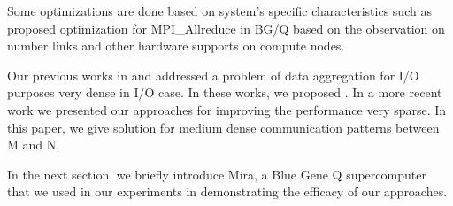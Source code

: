 Some optimizations are done based on system’s specific characteristics such as \cite{Kumar:Allreduce} proposed optimization for MPI\_Allreduce in BG/Q based on the observation on number links and other hardware supports on compute nodes.

Our previous works in \cite{Vishwanath:GLEAN} and \cite{SDAV:Bui2014b} addressed a problem of data aggregation for I/O purposes very dense in I/O case. In these works, we proposed . In a more recent work \cite{hbui:bgq} we presented our approaches for improving the performance very sparse. In this paper, we give solution for medium dense communication patterns between M and N.

In the next section, we briefly introduce Mira, a Blue Gene Q supercomputer that we used in our experiments in demonstrating the efficacy of our approaches.
